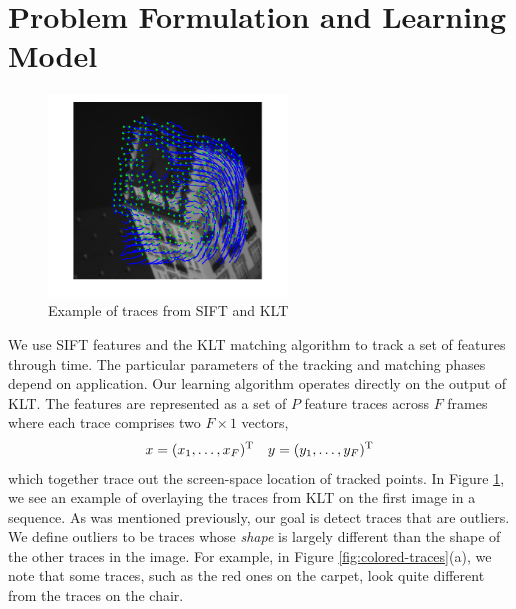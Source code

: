 \section{Problem Formulation and Learning Model}

\begin{figure}[h]
	\begin{center}
		\includegraphics[width=2.5in]{figs/hotel-traces.png}
	\end{center}
	\caption{Example of traces from SIFT and KLT}
	\label{fig:traces}
\end{figure}


We use SIFT features and the KLT matching algorithm to track a set of features
through time.  The particular parameters of the tracking and matching phases
depend on application.  Our learning algorithm operates directly on the output
of KLT.  The features are represented as a set of $P$ feature traces across $F$
frames where each trace comprises two $F\times 1$ vectors,
\begin{align*}
x = (x_1, \ldots, x_F)^{\rm T} && y = (y_1, \ldots, y_F)^{\rm T}
\end{align*}
which together trace out the screen-space location of tracked points.  
In Figure \ref{fig:traces}, we see an example of overlaying the traces from KLT
on the first image in a sequence.  As was mentioned previously, our goal is
detect traces that are outliers.  We define outliers to be traces whose {\it
shape} is largely different than the shape of the other traces in the image.
For example, in Figure \ref{fig:colored-traces}(a), we note that some traces,
such as the red ones on the carpet, look quite different from the traces on the
chair.

